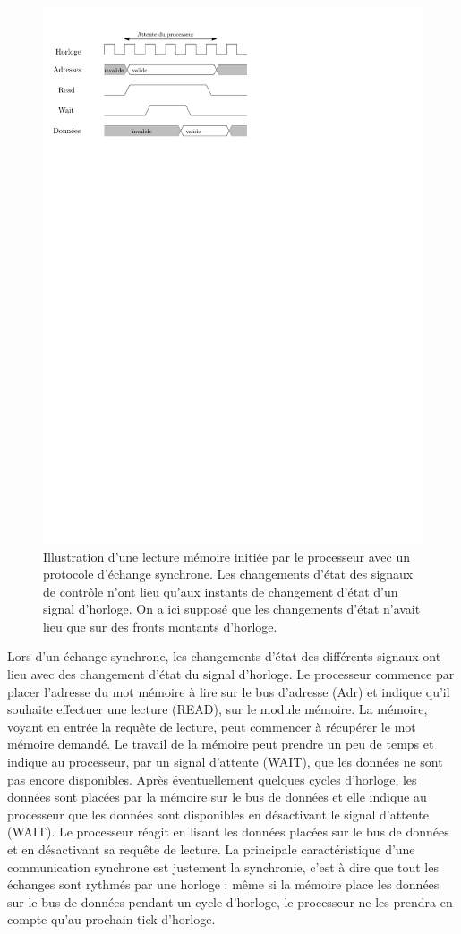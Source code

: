 \begin{figure}[htbp]
\includegraphics[width=0.75\linewidth]{Figs/sync_comm.pdf}
\caption{\label{fig:sync_comm} Illustration d'une lecture mémoire initiée par le processeur avec un protocole d'échange synchrone. Les changements d'état des signaux de contrôle n'ont lieu qu'aux instants de changement d'état d'un signal d'horloge. On a ici supposé que les changements d'état n'avait lieu que sur des fronts montants d'horloge.}
\end{figure}


Lors d'un échange synchrone, les changements d'état des différents signaux ont lieu avec des changement d'état du signal d'horloge. Le processeur commence par placer l'adresse du mot mémoire à lire sur le bus d'adresse (Adr) et indique qu'il souhaite effectuer une lecture (READ), sur le module mémoire. La mémoire, voyant en entrée la requête de lecture, peut commencer à récupérer le mot mémoire demandé. Le travail de la mémoire peut prendre un peu de temps et indique au processeur, par un signal d'attente (WAIT), que les données ne sont pas encore disponibles. Après éventuellement quelques cycles d'horloge, les données sont placées par la mémoire sur le bus de données et elle indique au processeur que les données sont disponibles en désactivant le signal d'attente (WAIT). Le processeur réagit en lisant les données placées sur le bus de données et en désactivant sa requête de lecture. La principale caractéristique d'une communication synchrone est justement la synchronie, c'est à dire que tout les échanges sont rythmés par une horloge : même si la mémoire place les données sur le bus de données pendant un cycle d'horloge, le processeur ne les prendra en compte qu'au prochain tick d'horloge.

